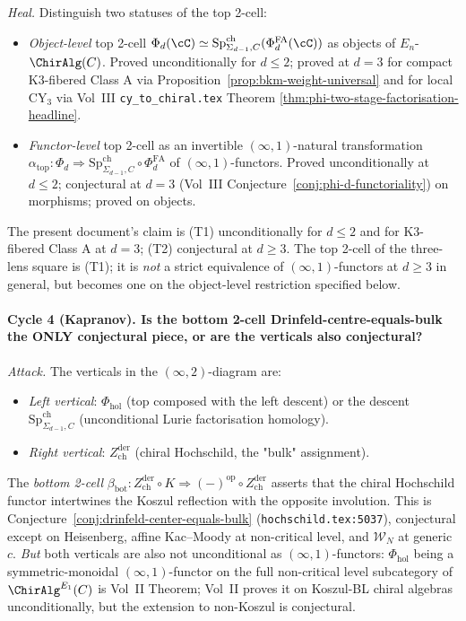 \emph{Heal.} Distinguish two statuses of the top 2-cell:
\begin{itemize}
 \item[(T1)] \emph{Object-level} top 2-cell
 $\Phi_d(\cC)\simeq\mathrm{Sp}^{\mathrm{ch}}_{\Sigma_{d-1},C}(
 \Phi^{\mathrm{FA}}_d(\cC))$
 as objects of $E_n$-$\ChirAlg(C)$. Proved unconditionally for
 $d\leq 2$; proved at $d=3$ for compact K3-fibered Class A via
 Proposition~\ref{prop:bkm-weight-universal} and for local CY$_3$ via
 Vol~III \texttt{cy\_to\_chiral.tex} Theorem
 \ref{thm:phi-two-stage-factorisation-headline}.
 \item[(T2)] \emph{Functor-level} top 2-cell as an invertible
 $(\infty,1)$-natural transformation
 $\alpha_{\mathrm{top}} \colon \Phi_d \Rightarrow
 \mathrm{Sp}^{\mathrm{ch}}_{\Sigma_{d-1},C}\circ\Phi^{\mathrm{FA}}_d$
 of $(\infty,1)$-functors. Proved unconditionally at $d\leq 2$;
 conjectural at $d=3$ (Vol~III
 Conjecture~\ref{conj:phi-d-functoriality}) on morphisms; proved on
 objects.
\end{itemize}
The present document's claim is (T1) unconditionally for $d\leq 2$
and for K3-fibered Class A at $d=3$; (T2) conjectural at $d\geq 3$.
The top 2-cell of the three-lens square is (T1); it is \emph{not} a
strict equivalence of $(\infty,1)$-functors at $d\geq 3$ in general,
but becomes one on the object-level restriction specified below.

\paragraph*{Cycle 4 (Kapranov). Is the bottom 2-cell
Drinfeld-centre-equals-bulk the ONLY conjectural piece, or are the
verticals also conjectural?}

\emph{Attack.} The verticals in the $(\infty,2)$-diagram are:
\begin{itemize}
 \item \emph{Left vertical}: $\Phi_{\mathrm{hol}}$ (top composed with
 the left descent) or the descent
 $\mathrm{Sp}^{\mathrm{ch}}_{\Sigma_{d-1},C}$ (unconditional Lurie
 factorisation homology).
 \item \emph{Right vertical}: $Z^{\mathrm{der}}_{\mathrm{ch}}$ (chiral
 Hochschild, the "bulk" assignment).
\end{itemize}
The \emph{bottom 2-cell}
$\beta_{\mathrm{bot}}\colon Z^{\mathrm{der}}_{\mathrm{ch}}\circ K \Rightarrow
(-)^{\mathrm{op}}\circ Z^{\mathrm{der}}_{\mathrm{ch}}$
asserts that the chiral Hochschild functor intertwines the Koszul
reflection with the opposite involution. This is
Conjecture~\ref{conj:drinfeld-center-equals-bulk}
(\texttt{hochschild.tex:5037}), conjectural except on Heisenberg,
affine Kac--Moody at non-critical level, and $\mathcal{W}_N$ at
generic $c$. \emph{But} both verticals are also not unconditional as
$(\infty,1)$-functors: $\Phi_{\mathrm{hol}}$ being a
symmetric-monoidal $(\infty,1)$-functor on the full non-critical level
subcategory of $\ChirAlg^{E_1}(C)$ is Vol~II Theorem; Vol~II proves
it on Koszul-BL chiral algebras unconditionally, but the extension to
non-Koszul is conjectural.

